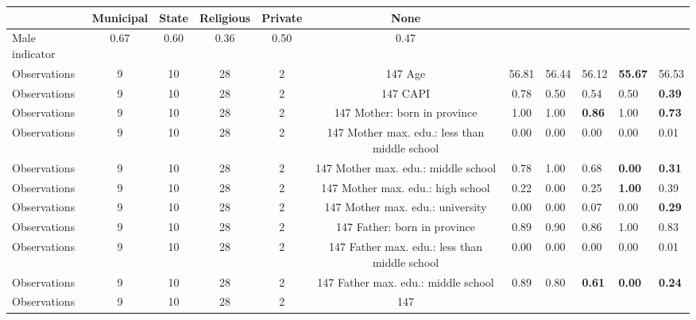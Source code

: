 \begin{tabular}{l c c c c c c }
\toprule
& \textbf{Municipal} & \textbf{State} & \textbf{Religious} & \textbf{Private} & \textbf{None} \\
\midrule
Male indicator &      0.67 &      0.60 &      0.36 &      0.50 &      0.47 \\
\midrule
Observations &         9 &        10 &        28 &         2 &       147
Age &     56.81 &     56.44 &     56.12 & \textbf{    55.67} &     56.53 \\
\midrule
Observations &         9 &        10 &        28 &         2 &       147
CAPI &      0.78 &      0.50 &      0.54 &      0.50 & \textbf{     0.39} \\
\midrule
Observations &         9 &        10 &        28 &         2 &       147
Mother: born in province &      1.00 &      1.00 & \textbf{     0.86} &      1.00 & \textbf{     0.73} \\
\midrule
Observations &         9 &        10 &        28 &         2 &       147
Mother max. edu.: less than middle school &      0.00 &      0.00 &      0.00 &      0.00 &      0.01 \\
\midrule
Observations &         9 &        10 &        28 &         2 &       147
Mother max. edu.: middle school &      0.78 &      1.00 &      0.68 & \textbf{     0.00} & \textbf{     0.31} \\
\midrule
Observations &         9 &        10 &        28 &         2 &       147
Mother max. edu.: high school &      0.22 &      0.00 &      0.25 & \textbf{     1.00} &      0.39 \\
\midrule
Observations &         9 &        10 &        28 &         2 &       147
Mother max. edu.: university &      0.00 &      0.00 &      0.07 &      0.00 & \textbf{     0.29} \\
\midrule
Observations &         9 &        10 &        28 &         2 &       147
Father: born in province &      0.89 &      0.90 &      0.86 &      1.00 &      0.83 \\
\midrule
Observations &         9 &        10 &        28 &         2 &       147
Father max. edu.: less than middle school &      0.00 &      0.00 &      0.00 &      0.00 &      0.01 \\
\midrule
Observations &         9 &        10 &        28 &         2 &       147
Father max. edu.: middle school &      0.89 &      0.80 & \textbf{     0.61} & \textbf{     0.00} & \textbf{     0.24} \\
\midrule
Observations &         9 &        10 &        28 &         2 &       147

\end{tabular}
